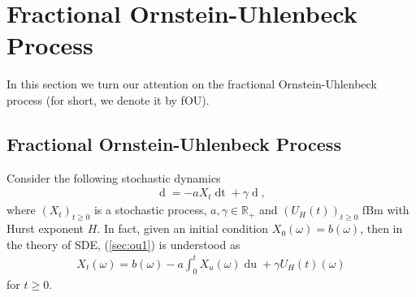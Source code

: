 \documentclass[a4paper, twoside, 11pt]{article}
\theoremstyle{definition}
\newtheorem{definition}{\scshape Definition}[section]
\newtheorem{theorem}[definition]{\scshape Theorem}
\begin{document}



  \newpage
  \section{Fractional Ornstein-Uhlenbeck Process}
  \setcounter{equation}{0}
  In this section we turn our attention on the fractional Ornstein-Uhlenbeck process (for short, we denote it by fOU). 
  \subsection{Fractional Ornstein-Uhlenbeck Process}
  Consider the following stochastic dynamics
  \begin{eqnarray}
   \mathop{dX_t} = -aX_t\mathop{dt} + \gamma \mathop{dU_H(t)},
   \label{sec:ou1}
  \end{eqnarray}
  where $(X_t)_{t\ge 0}$ is a stochastic process, $a, \gamma\in\mathbb{R}_{+}$ and $(U_H(t))_{t\ge 0} $ fBm with Hurst exponent $H$. In fact, given an initial condition $X_0(\omega)=b(\omega)$, then in the theory of SDE, (\ref{sec:ou1}) is understood as
  \begin{eqnarray}
	X_t(\omega) = b(\omega) - a\int_0^t X_u(\omega) \mathop{du} + \gamma U_H(t)(\omega)
	\label{sec:oup}
  \end{eqnarray}
  for $t \ge 0$.
\end{document}
